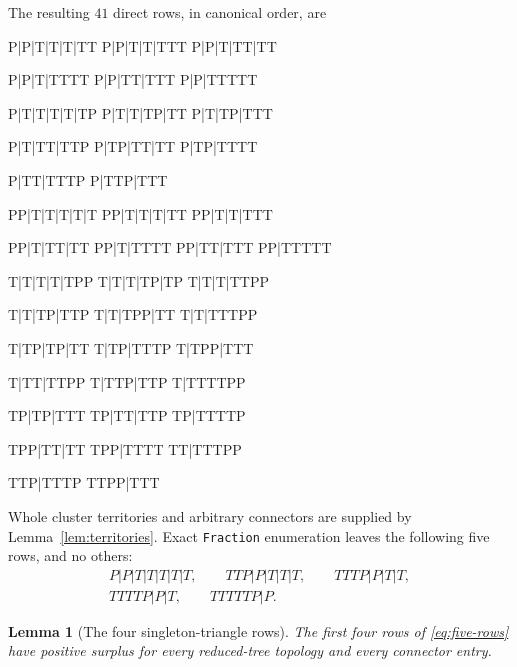 \documentclass[11pt]{article}
\newtheorem{lemma}[theorem]{Lemma}
\begin{document}
The resulting $41$ direct rows, in canonical order, are
\begin{center}
\begin{minipage}{0.94\textwidth}\ttfamily\small
P|P|T|T|T|TT \quad P|P|T|T|TTT \quad P|P|T|TT|TT\par
P|P|T|TTTT \quad P|P|TT|TTT \quad P|P|TTTTT\par
P|T|T|T|T|TP \quad P|T|T|TP|TT \quad P|T|TP|TTT\par
P|T|TT|TTP \quad P|TP|TT|TT \quad P|TP|TTTT\par
P|TT|TTTP \quad P|TTP|TTT\par
PP|T|T|T|T|T \quad PP|T|T|T|TT \quad PP|T|T|TTT\par
PP|T|TT|TT \quad PP|T|TTTT \quad PP|TT|TTT \quad PP|TTTTT\par
T|T|T|T|TPP \quad T|T|T|TP|TP \quad T|T|T|TTPP\par
T|T|TP|TTP \quad T|T|TPP|TT \quad T|T|TTTPP\par
T|TP|TP|TT \quad T|TP|TTTP \quad T|TPP|TTT\par
T|TT|TTPP \quad T|TTP|TTP \quad T|TTTTPP\par
TP|TP|TTT \quad TP|TT|TTP \quad TP|TTTTP\par
TPP|TT|TT \quad TPP|TTTT \quad TT|TTTPP\par
TTP|TTTP \quad TTPP|TTT
\end{minipage}
\end{center}
Whole cluster territories and arbitrary connectors are supplied by
Lemma~\ref{lem:territories}.  Exact \texttt{Fraction} enumeration leaves the
following five rows, and no others:
\begin{equation}\label{eq:five-rows}
 \begin{gathered}
 P|P|T|T|T|T|T,\qquad
 TTP|P|T|T|T,\qquad
 TTTP|P|T|T,\\
 TTTTP|P|T,\qquad
 TTTTTP|P.
 \end{gathered}
\end{equation}

\begin{lemma}[The four singleton-triangle rows]\label{lem:four-rows}
The first four rows of \eqref{eq:five-rows} have positive surplus for every
reduced-tree topology and every connector entry.
\end{lemma}
\end{document}
